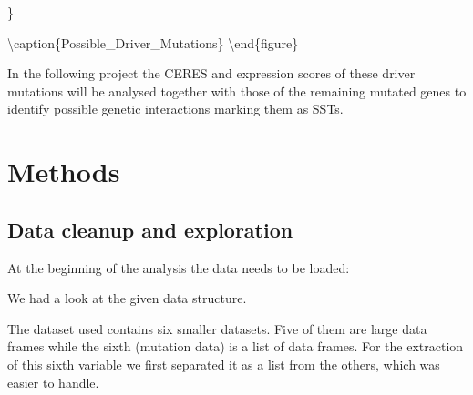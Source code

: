 \documentclass[]{article}
\newenvironment{Shaded}{\begin{snugshade}}{\end{snugshade}}
\newcommand{\CommentTok}[1]{\textcolor[rgb]{0.56,0.35,0.01}{\textit{#1}}}
\newcommand{\KeywordTok}[1]{\textcolor[rgb]{0.13,0.29,0.53}{\textbf{#1}}}
\newcommand{\NormalTok}[1]{#1}
\newcommand{\OperatorTok}[1]{\textcolor[rgb]{0.81,0.36,0.00}{\textbf{#1}}}
\newcommand{\StringTok}[1]{\textcolor[rgb]{0.31,0.60,0.02}{#1}}
\begin{document}
\}

\textbackslash caption\{Possible\_Driver\_Mutations\}\label{fig:driver mutations}
\textbackslash end\{figure\}

In the following project the CERES and expression scores of these driver
mutations will be analysed together with those of the remaining mutated
genes to identify possible genetic interactions marking them as SSTs.

\hypertarget{methods}{%
\section{Methods}\label{methods}}

\hypertarget{data-cleanup-and-exploration}{%
\subsection{Data cleanup and
exploration}\label{data-cleanup-and-exploration}}

At the beginning of the analysis the data needs to be loaded:

\begin{Shaded}
\end{Shaded}

We had a look at the given data structure.

The dataset used contains six smaller datasets. Five of them are large
data frames while the sixth (mutation data) is a list of data frames.
For the extraction of this sixth variable we first separated it as a
list from the others, which was easier to handle.
\end{document}
